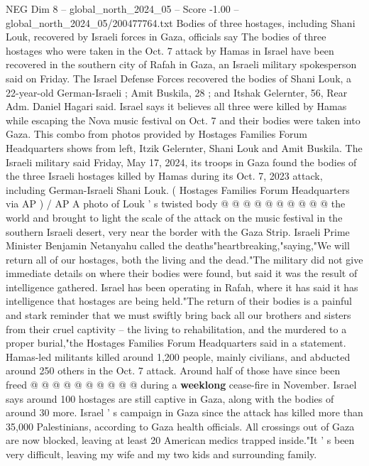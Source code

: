 \begin{textsample}{NEG Dim 8 – global\_north\_2024\_05 – Score -1.00 – global\_north\_2024\_05/200477764.txt}  \label{ex:f8_neg_271}
Bodies of three hostages, including Shani Louk, recovered by Israeli forces in Gaza, officials say The bodies of three hostages who were taken in the Oct. 7 attack by Hamas in Israel have been recovered in the southern city of Rafah in Gaza, an Israeli military spokesperson said on Friday.
The Israel Defense Forces recovered the bodies of Shani Louk, a 22-year-old German-Israeli ; Amit Buskila, 28 ; and Itshak Gelernter, 56, Rear Adm.
Daniel Hagari said.
Israel says it believes all three were killed by Hamas while escaping the Nova music festival on Oct. 7 and their bodies were taken into Gaza.
This combo from photos provided by Hostages Families Forum Headquarters shows from left, Itzik Gelernter, Shani Louk and Amit Buskila.
The Israeli military said Friday, May 17, 2024, its troops in Gaza found the bodies of the three Israeli hostages killed by Hamas during its Oct. 7, 2023 attack, including German-Israeli Shani Louk. ( Hostages Families Forum Headquarters via AP ) / AP A photo of Louk ' s twisted body @ @ @ @ @ @ @ @ @ @ the world and brought to light the scale of the attack on the music festival in the southern Israeli desert, very near the border with the Gaza Strip.
Israeli Prime Minister Benjamin Netanyahu called the deaths"heartbreaking,"saying,"We will return all of our hostages, both the living and the dead."The military did not give immediate details on where their bodies were found, but said it was the result of intelligence gathered.
Israel has been operating in Rafah, where it has said it has intelligence that hostages are being held."The return of their bodies is a painful and stark reminder that we must swiftly bring back all our brothers and sisters from their cruel captivity -- the living to rehabilitation, and the murdered to a proper burial,"the Hostages Families Forum Headquarters said in a statement.
Hamas-led militants killed around 1,200 people, mainly civilians, and abducted around 250 others in the Oct. 7 attack.
Around half of those have since been freed @ @ @ @ @ @ @ @ @ @ during a \textbf{weeklong} cease-fire in November.
Israel says around 100 hostages are still captive in Gaza, along with the bodies of around 30 more.
Israel ' s campaign in Gaza since the attack has killed more than 35,000 Palestinians, according to Gaza health officials.
All crossings out of Gaza are now blocked, leaving at least 20 American medics trapped inside."It ' s been very difficult, leaving my wife and my two kids and surrounding family.

\end{textsample}
